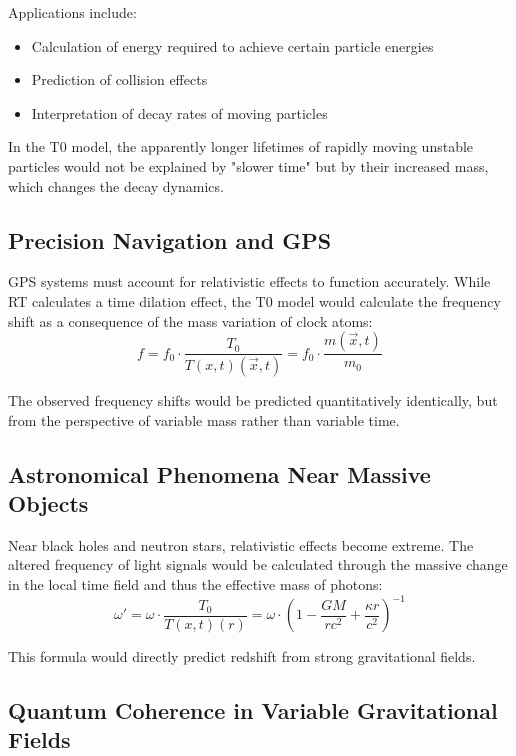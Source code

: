 \documentclass[12pt,a4paper]{article}
\newcommand{\Tfieldt}{T(x,t)}
\newcommand{\vecx}{\vec{x}}
\begin{document}
	Applications include:
	\begin{itemize}
		\item Calculation of energy required to achieve certain particle energies
		\item Prediction of collision effects
		\item Interpretation of decay rates of moving particles
	\end{itemize}
	
	In the T0 model, the apparently longer lifetimes of rapidly moving unstable particles would not be explained by "slower time" but by their increased mass, which changes the decay dynamics.
	
	\subsection{Precision Navigation and GPS}
	\label{subsec:gps}
	
	GPS systems must account for relativistic effects to function accurately. While RT calculates a time dilation effect, the T0 model would calculate the frequency shift as a consequence of the mass variation of clock atoms:
	\begin{equation}
		f = f_0 \cdot \frac{T_0}{\Tfieldt(\vecx,t)} = f_0 \cdot \frac{m(\vecx,t)}{m_0}
	\end{equation}
	
	The observed frequency shifts would be predicted quantitatively identically, but from the perspective of variable mass rather than variable time.
	
	\subsection{Astronomical Phenomena Near Massive Objects}
	\label{subsec:massive_objects}
	
	Near black holes and neutron stars, relativistic effects become extreme. The altered frequency of light signals would be calculated through the massive change in the local time field and thus the effective mass of photons:
	\begin{equation}
		\omega' = \omega \cdot \frac{T_0}{\Tfieldt(r)} = \omega \cdot \left(1-\frac{GM}{rc^2} + \frac{\kappa r}{c^2}\right)^{-1}
	\end{equation}
	
	This formula would directly predict redshift from strong gravitational fields.
	
	\subsection{Quantum Coherence in Variable Gravitational Fields}
	\label{subsec:quantum_coherence}
	
\end{document}

